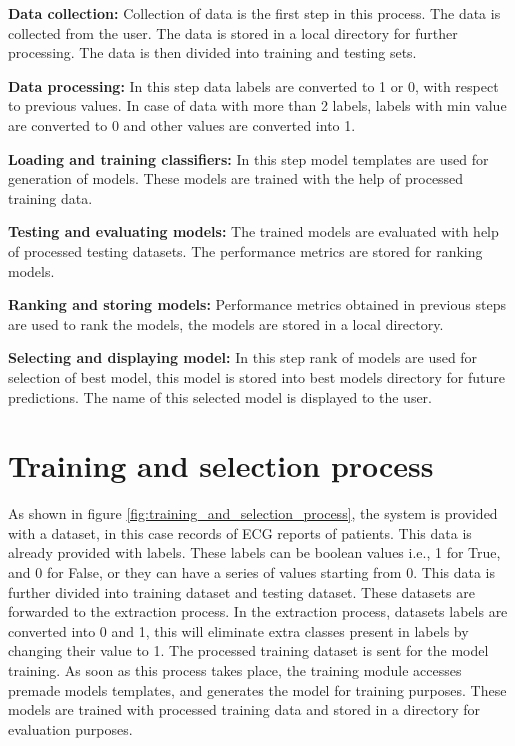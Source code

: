 \textbf{Data collection:} Collection of data is the first step in this process. The data is
collected from the user. The data is stored in a local directory for further processing. The
data is then divided into training and testing sets.

\vspace{-0.5em}
\textbf{Data processing:} In this step data labels are converted to 1 or 0, with respect to
previous values. In case of data with more than 2 labels, labels with min value are converted
to 0 and other values are converted into 1.

\vspace{-0.5em}
\textbf{Loading and training classifiers:} In this step model templates are used for generation
of models. These models are trained with the help of processed training data.

\vspace{-0.5em}
\textbf{Testing and evaluating models:} The trained models are evaluated with help of processed
testing datasets. The performance metrics are stored for ranking models.

\vspace{-0.5em}
\textbf{Ranking and storing models:} Performance metrics obtained in previous steps are used to
rank the models, the models are stored in a local directory.

\vspace{-0.5em}
\textbf{Selecting and displaying model:} In this step rank of models are used for selection of
best model, this model is stored into best models directory for future predictions. The name of
this selected model is displayed to the user.

\section{Training and selection process} \label{sec:data_flow}

As shown in figure \ref{fig:training_and_selection_process}, the system is provided with a
dataset, in this case records of ECG reports of patients. This data is already provided with
labels. These labels can be boolean values i.e., 1 for True, and 0 for False, or they can have
a series of values starting from 0. This data is further divided into training dataset and
testing dataset. These datasets are forwarded to the extraction process. In the extraction
process, datasets labels are converted into 0 and 1, this will eliminate extra classes present
in labels by changing their value to 1. The processed training dataset is sent for the model
training. As soon as this process takes place, the training module accesses premade models
templates, and generates the model for training purposes. These models are trained with
processed training data and stored in a directory for evaluation purposes.

